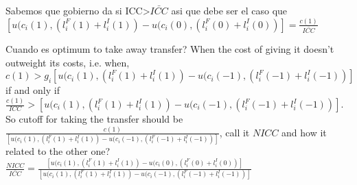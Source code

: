 \documentclass[12pt]{article}
\begin{document}
Sabemos que gobierno da si ICC>$\bar{ICC}$ asi que debe ser el caso que $[u(c_i(1),(l^F_i(1)+l^I_i(1))-u(c_i(0),(l^F_i(0)+l^I_i(0))]=\frac{c(1)}{\bar{ICC}}$

Cuando es optimum to take away transfer? When the cost of giving it doesn't outweight its costs, i.e. when, $c(1)>g_i[u(c_i(1),(l^F_i(1)+l^I_i(1))-u(c_i(-1),(l^F_i(-1)+l^I_i(-1))]$ if and only if $\frac{c(1)}{ICC}>[u(c_i(1),(l^F_i(1)+l^I_i(1))-u(c_i(-1),(l^F_i(-1)+l^I_i(-1))]$. So cutoff for taking the transfer should be $\frac{c(1)}{[u(c_i(1),(l^F_i(1)+l^I_i(1))-u(c_i(-1),(l^F_i(-1)+l^I_i(-1))]}$, call it $NICC$ and how it related to the other one? $\frac{NICC}{\bar{ICC}} = \frac{[u(c_i(1),(l^F_i(1)+l^I_i(1))-u(c_i(0),(l^F_i(0)+l^I_i(0))]}{[u(c_i(1),(l^F_i(1)+l^I_i(1))-u(c_i(-1),(l^F_i(-1)+l^I_i(-1))]}$


\end{document}
